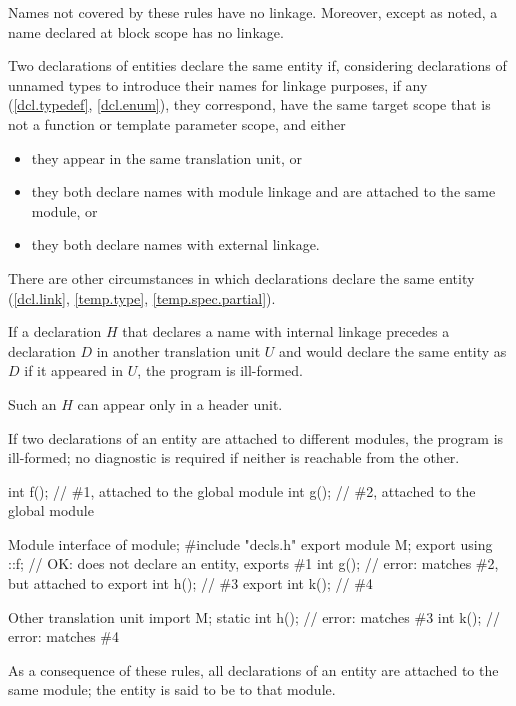 \pnum
{}%
Names not covered by these rules have no linkage. Moreover, except as
noted, a name declared at block scope has no
linkage.

\pnum
Two declarations of entities declare the same entity
if, considering declarations of unnamed types to introduce their names
for linkage purposes, if any (\ref{dcl.typedef}, \ref{dcl.enum}),
they correspond,
have the same target scope that is not a function or template parameter scope,
and either
\begin{itemize}
\item
they appear in the same translation unit, or
\item
they both declare names with module linkage and are attached to the same module, or
\item
they both declare names with external linkage.
\end{itemize}
\begin{note}
There are other circumstances in which declarations declare the same entity
(\ref{dcl.link}, \ref{temp.type}, \ref{temp.spec.partial}).
\end{note}

\pnum
If a declaration $H$ that declares a name with internal linkage
precedes a declaration $D$ in another translation unit $U$ and
would declare the same entity as $D$ if it appeared in $U$,
the program is ill-formed.
\begin{note}
Such an $H$ can appear only in a header unit.
\end{note}

\pnum
If two declarations of an entity are
attached to different modules, the program is ill-formed;
no diagnostic is required if neither is reachable from the other.
\begin{example}
\begin{codeblocktu}{}
int f();            // \#1, attached to the global module
int g();            // \#2, attached to the global module
\end{codeblocktu}

\begin{codeblocktu}{Module interface of }
module;
#include "decls.h"
export module M;
export using ::f;   // OK: does not declare an entity, exports \#1
int g();            // error: matches \#2, but attached to 
export int h();     // \#3
export int k();     // \#4
\end{codeblocktu}

\begin{codeblocktu}{Other translation unit}
import M;
static int h();     // error: matches \#3
int k();            // error: matches \#4
\end{codeblocktu}
\end{example}
As a consequence of these rules,
all declarations of an entity are attached to the same module;
the entity is said to be  to that module.

